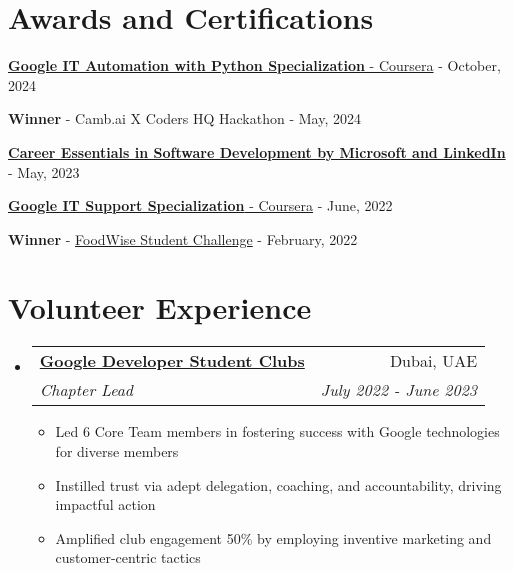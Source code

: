 \documentclass[a4paper,20pt]{article}
\makeatletter
\newcommand{\resumeItemWithoutTitle}[1] {
	\item\small{
		{#1 \vspace{-2pt}}
	}
}
\newcommand{\resumeSubheading}[4] {
	\vspace{-1pt}\item
	\begin{tabular*}{0.97\textwidth}{l@{\extracolsep{\fill}}r}
		\textbf{#1} & #2 \\
		\textit{#3} & \textit{#4} \\
	\end{tabular*}\vspace{-5pt}
}
\newcommand{\resumeSubHeadingListStart}{\begin{itemize}[leftmargin=*]}
\newcommand{\resumeSubHeadingListEnd}{\end{itemize}}
\newcommand{\resumeItemListStart}{\begin{itemize}}
\newcommand{\resumeItemListEnd}{\end{itemize}\vspace{-5pt}}
\makeatother
\begin{document}
\section{Awards and Certifications}
\begin{description}[font=$\bullet$]
	\item {\href{https://coursera.org/verify/professional-cert/TCQO05PHHGE5}{\textbf{Google IT Automation with Python Specialization} - Coursera} - October, 2024}
	\vspace{-5pt}
	\item {\textbf{Winner} - Camb.ai X Coders HQ Hackathon - May, 2024}
	\vspace{-5pt}
	\item {\href{https://www.linkedin.com/learning/certificates/89ecc674e4f0587a88390cc07ce509093d8b63cd8bcb02e3fd833e966bba7ea8}{\textbf{Career Essentials in Software Development by Microsoft and LinkedIn}} - May, 2023}
	\vspace{-5pt}
	\item {\href{https://coursera.org/verify/professional-cert/KXSX89ULVN5F}{\textbf{Google IT Support Specialization} - Coursera} - June, 2022}
	\vspace{-5pt}
	\item {\textbf{Winner} - \href{https://www.foodforfuturesummit.com/foodwise}{FoodWise Student Challenge} - February, 2022}
	\vspace{-5pt}

\end{description}
\vspace{2pt}

\section{Volunteer Experience}
	\resumeSubHeadingListStart
		\resumeSubheading{\href{https://gdg.community.dev/gdg-on-campus-heriot-watt-university-dubai-dubai-united-arab-emirates}{Google Developer Student Clubs}}{Dubai, UAE}{Chapter Lead}{July 2022 - June 2023}
		\resumeItemListStart
			\resumeItemWithoutTitle{Led 6 Core Team members in fostering success with Google technologies for diverse members}
			\resumeItemWithoutTitle{Instilled trust via adept delegation, coaching, and accountability, driving impactful action}
			\resumeItemWithoutTitle{Amplified club engagement 50\% by employing inventive marketing and customer-centric tactics}
		\resumeItemListEnd
	\resumeSubHeadingListEnd

\vspace{-5pt}
\end{document}
